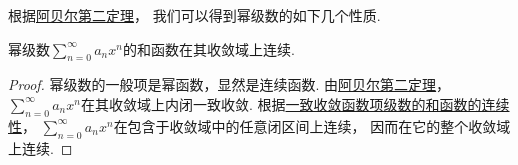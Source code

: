 根据\hyperref[theorem:无穷级数.阿贝尔定理2]{阿贝尔第二定理}，
我们可以得到幂级数的如下几个性质.

\begin{property}\label{theorem:无穷级数.幂级数的和函数的性质1}
幂级数\(\sum_{n=0}^\infty a_n x^n\)的和函数在其收敛域上连续.
\begin{proof}
幂级数的一般项是幂函数，显然是连续函数.
由\hyperref[theorem:无穷级数.阿贝尔定理2]{阿贝尔第二定理}，
\(\sum_{n=0}^\infty a_n x^n\)在其收敛域上内闭一致收敛.
根据\hyperref[theorem:函数项级数.连续函数项级数的内闭一致收敛性保证和函数的连续性]{一致收敛函数项级数的和函数的连续性}，
\(\sum_{n=0}^\infty a_n x^n\)在包含于收敛域中的任意闭区间上连续，
因而在它的整个收敛域上连续.
\end{proof}
\end{property}

